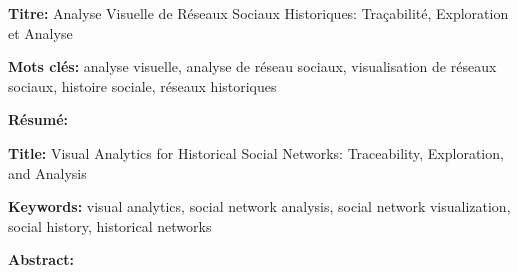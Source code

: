 \documentclass[12pt,a4paper, twoside, headings=small]{book}
\begin{document}
    \small

    \begin{mdframed}[linecolor=Prune,linewidth=1]

        \textbf{Titre:} Analyse Visuelle de Réseaux Sociaux Historiques: Traçabilité, Exploration et Analyse

        \noindent \textbf{Mots clés:} analyse visuelle, analyse de réseau sociaux, visualisation de réseaux sociaux, histoire sociale, réseaux historiques

        \vspace{-.5cm}
        \begin{multicols}{2}
            \noindent \textbf{Résumé:} \abstractfrnew
        \end{multicols}

    \end{mdframed}

    \vspace{8mm}

    \begin{mdframed}[linecolor=Prune,linewidth=1]

        \textbf{Title:} Visual Analytics for Historical Social Networks: Traceability, Exploration, and Analysis

        \noindent \textbf{Keywords:} visual analytics, social network analysis, social network visualization, social history, historical networks

        \begin{multicols}{2}
            \noindent \textbf{Abstract:} \abstractengnew
        \end{multicols}
    \end{mdframed}

    \titleformat{\chapter}[hang]{\bfseries\Huge\color{Prune}}{\thechapter\quad}{.1ex}{}{}%
    \titlespacing{\chapter}{0pc}{0ex}{1.2pc}
\end{document}
